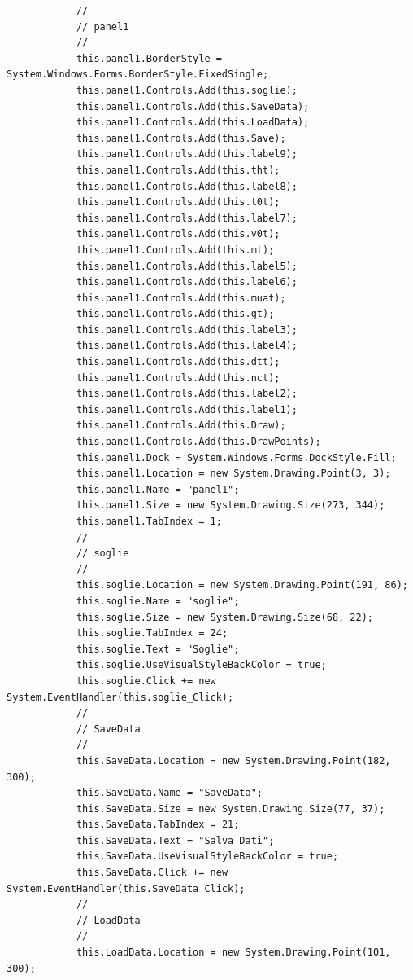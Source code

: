 \documentclass[11pt]{article} %
\begin{document}
\begin{lstlisting}
            // 
            // panel1
            // 
            this.panel1.BorderStyle = System.Windows.Forms.BorderStyle.FixedSingle;
            this.panel1.Controls.Add(this.soglie);
            this.panel1.Controls.Add(this.SaveData);
            this.panel1.Controls.Add(this.LoadData);
            this.panel1.Controls.Add(this.Save);
            this.panel1.Controls.Add(this.label9);
            this.panel1.Controls.Add(this.tht);
            this.panel1.Controls.Add(this.label8);
            this.panel1.Controls.Add(this.t0t);
            this.panel1.Controls.Add(this.label7);
            this.panel1.Controls.Add(this.v0t);
            this.panel1.Controls.Add(this.mt);
            this.panel1.Controls.Add(this.label5);
            this.panel1.Controls.Add(this.label6);
            this.panel1.Controls.Add(this.muat);
            this.panel1.Controls.Add(this.gt);
            this.panel1.Controls.Add(this.label3);
            this.panel1.Controls.Add(this.label4);
            this.panel1.Controls.Add(this.dtt);
            this.panel1.Controls.Add(this.nct);
            this.panel1.Controls.Add(this.label2);
            this.panel1.Controls.Add(this.label1);
            this.panel1.Controls.Add(this.Draw);
            this.panel1.Controls.Add(this.DrawPoints);
            this.panel1.Dock = System.Windows.Forms.DockStyle.Fill;
            this.panel1.Location = new System.Drawing.Point(3, 3);
            this.panel1.Name = "panel1";
            this.panel1.Size = new System.Drawing.Size(273, 344);
            this.panel1.TabIndex = 1;
            // 
            // soglie
            // 
            this.soglie.Location = new System.Drawing.Point(191, 86);
            this.soglie.Name = "soglie";
            this.soglie.Size = new System.Drawing.Size(68, 22);
            this.soglie.TabIndex = 24;
            this.soglie.Text = "Soglie";
            this.soglie.UseVisualStyleBackColor = true;
            this.soglie.Click += new System.EventHandler(this.soglie_Click);
            // 
            // SaveData
            // 
            this.SaveData.Location = new System.Drawing.Point(182, 300);
            this.SaveData.Name = "SaveData";
            this.SaveData.Size = new System.Drawing.Size(77, 37);
            this.SaveData.TabIndex = 21;
            this.SaveData.Text = "Salva Dati";
            this.SaveData.UseVisualStyleBackColor = true;
            this.SaveData.Click += new System.EventHandler(this.SaveData_Click);
            // 
            // LoadData
            // 
            this.LoadData.Location = new System.Drawing.Point(101, 300);

\end{lstlisting}
\end{document}
